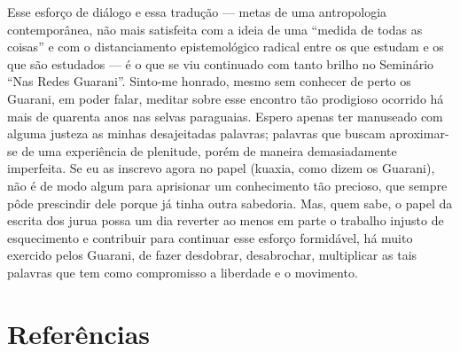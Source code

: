 Esse esforço de diálogo e essa tradução --- metas de uma antropologia
contemporânea, não mais satisfeita com a ideia de uma ``medida de todas
as coisas'' e com o distanciamento epistemológico radical entre os que
estudam e os que são estudados --- é o que se viu continuado com tanto
brilho no Seminário ``Nas Redes Guarani''. Sinto-me honrado, mesmo sem
conhecer de perto os Guarani, em poder falar, meditar sobre esse
encontro tão prodigioso ocorrido há mais de quarenta anos nas selvas
paraguaias. Espero apenas ter manuseado com alguma justeza as minhas
desajeitadas palavras; palavras que buscam aproximar-se de uma
experiência de plenitude, porém de maneira demasiadamente imperfeita.
Se eu as inscrevo agora no papel (kuaxia, como dizem os Guarani), não é
de modo algum para aprisionar um conhecimento tão precioso, que sempre
pôde prescindir dele porque já tinha outra sabedoria. Mas, quem sabe, o
papel da escrita dos jurua possa um dia reverter ao menos em parte o
trabalho injusto de esquecimento e contribuir para continuar esse
esforço formidável, há muito exercido pelos Guarani, de fazer
desdobrar, desabrochar, multiplicar as tais palavras que tem como
compromisso a liberdade e o movimento.

\section{Referências}

